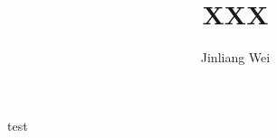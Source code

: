 \documentclass[12pt, a4paper]{llncs}
\begin{document}
\title{XXX}
\author{Jinliang Wei}




test

\cite{Barham:2003:XAV:945445.945462}
\end{document}
